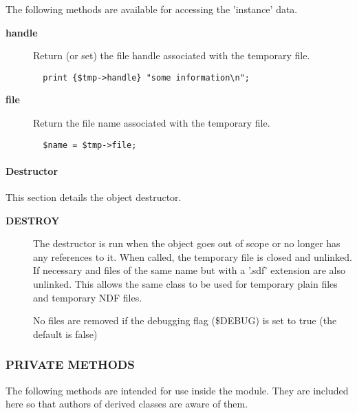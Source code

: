 The following methods are available for accessing the 
'instance' data.

\begin{description}

\item[\textbf{handle}] \mbox{}

Return (or set) the file handle associated with the temporary 
file.

\begin{verbatim}
  print {$tmp->handle} "some information\n";
\end{verbatim}

\item[\textbf{file}] \mbox{}

Return the file name associated with the temporary file.

\begin{verbatim}
  $name = $tmp->file;
\end{verbatim}
\end{description}
\paragraph*{Destructor\label{ORAC::TempFile_Destructor}}


This section details the object destructor.

\begin{description}

\item[\textbf{DESTROY}] \mbox{}

The destructor is run when the object goes out of scope
or no longer has any references to it. When called, the
temporary file is closed and unlinked. If necessary
and files of the same name but with a '.sdf' extension
are also unlinked. This allows the same class to be used
for temporary plain files and temporary NDF files.



No files are removed if the debugging flag (\$DEBUG) is set to
true (the default is false)

\end{description}
\subsubsection*{PRIVATE METHODS\label{ORAC::TempFile_PRIVATE_METHODS}}


The following methods are intended for use inside the module.
They are included here so that authors of derived classes are 
aware of them.

